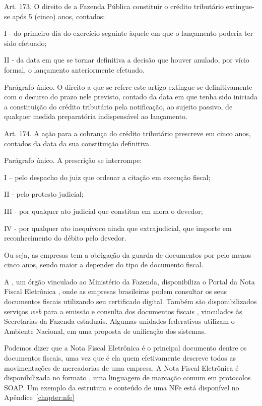 \begin{citacao}
Art. 173. O direito de a Fazenda Pública constituir o crédito tributário extingue-se após 5 (cinco) anos, contados:

I - do primeiro dia do exercício seguinte àquele em que o lançamento poderia ter sido efetuado;

II - da data em que se tornar definitiva a decisão que houver anulado, por vício formal, o lançamento anteriormente efetuado.

Parágrafo único. O direito a que se refere este artigo extingue-se definitivamente com o decurso do prazo nele previsto, contado da data em que tenha sido iniciada a constituição do crédito tributário pela notificação, ao sujeito passivo, de qualquer medida preparatória indispensável ao lançamento.

Art. 174. A ação para a cobrança do crédito tributário prescreve em cinco anos, contados da data da sua constituição definitiva.

Parágrafo único. A prescrição se interrompe:

I – pelo despacho do juiz que ordenar a citação em execução fiscal;

II - pelo protesto judicial;

III - por qualquer ato judicial que constitua em mora o devedor;

IV - por qualquer ato inequívoco ainda que extrajudicial, que importe em reconhecimento do débito pelo devedor.
\end{citacao}

Ou seja, as empresas tem a obrigação da guarda de documentos por pelo menos cinco anos, sendo maior a depender do tipo de documento fiscal.

A , um órgão vinculado ao Ministério da Fazenda, disponibiliza o Portal da Nota Fiscal Eletrônica \cite{portal-sefaz}, onde as empresas brasileiras podem consultar os seus documentos fiscais utilizando seu certificado digital. Também são disponibilizados serviços \textit{web} para a emissão e consulta dos documentos fiscais \cite{portal-sefaz-webservices}, vinculados às Secretarias da Fazenda estaduais. Algumas unidades federativas utilizam o Ambiente Nacional, em uma proposta de unificação dos sistemas.

Podemos dizer que a Nota Fiscal Eletrônica é o principal documento dentre os documentos fiscais, uma vez que é ela quem efetivamente descreve todos as movimentações de mercadorias de uma empresa. A Nota Fiscal Eletrônica é disponibilizada no formato  \cite{portal-w3c-xml}, uma linguagem de marcação comum em protocolos SOAP. Um exemplo da estrutura e conteúdo de uma NFe está disponível no Apêndice~\ref{chapter:nfe}

